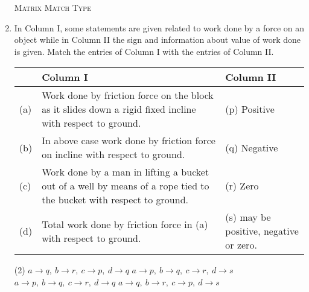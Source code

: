 \documentclass{article}
\renewcommand{\ans}{\quad}
\begin{document}
\begin{enumerate}
    \begin{center}
        \textsc{Matrix Match Type}
    \end{center}

    \item In Column I, some statements are given related to work done by a force on an object while in Column II the sign and information about value of work done is given. Match the entries of Column I with the entries of Column II.
    \begin{center}
        \renewcommand{\arraystretch}{1.5}
        \begin{table}[h]
            \centering
            \begin{tabular}{p{0.25cm}p{8.5cm}|p{3cm}}
            \hline
            & Column I & Column II \\
            \hline
            (a)& Work done by friction force on the block as it slides down a rigid fixed incline with respect to ground. & (p) Positive\\
            (b)& In above case work done by friction force on incline with respect to ground. & (q) Negative\\
            (c)& Work done by a man in lifting a bucket out of a well by means of a rope tied to the bucket with respect to ground. & (r) Zero\\
            (d)& Total work done by friction force in (a) with respect to ground. & (s) may be positive, negative or zero.\\
            \hline
            \end{tabular}
        \end{table}
    \end{center}
    \begin{tasks}(2)
        \task $a \rightarrow q, ~b \rightarrow r, ~c \rightarrow p, ~ d\rightarrow q$\ans
        \task $a \rightarrow p, ~b \rightarrow q, ~c \rightarrow r, ~ d\rightarrow s$
        \task $a \rightarrow p, ~b \rightarrow q, ~c \rightarrow r, ~ d\rightarrow q$
        \task $a \rightarrow q, ~b \rightarrow r, ~c \rightarrow p, ~ d\rightarrow s$
    \end{tasks}
    

\end{enumerate}
\end{document}
